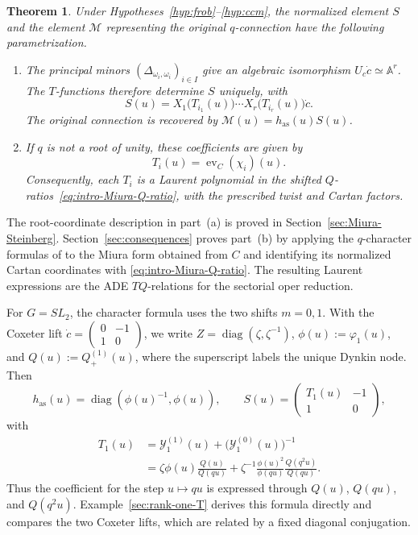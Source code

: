 \documentclass[11pt,leqno]{amsart}
\numberwithin{equation}{section}
\theoremstyle{plain}
\newtheorem{theorem}{Theorem}[section]
\theoremstyle{definition}
\theoremstyle{plain}
\theoremstyle{definition}
\theoremstyle{remark}
\begin{document}
\begin{theorem}\label{thm:intro-TQ-relations}
Under Hypotheses~\ref{hyp:frob}--\ref{hyp:ccm}, the normalized element $S$ and the element $\mathscr M$ representing the original $q$-connection have the following parametrization.
\begin{enumerate}[label=(\alph*)]
\item The principal minors $(\Delta_{\omega_i,\omega_i})_{i\in I}$ give an algebraic isomorphism $U_c\dot c\simeq\mathbb A^r$.  The $T$-functions therefore determine $S$ uniquely, with
\begin{equation}\label{eq:intro-Steinberg-T-parameterization}
 S(u)=X_1\bigl(T_{i_1}(u)\bigr)\cdots
       X_r\bigl(T_{i_r}(u)\bigr)\dot c.
\end{equation}
The original connection is recovered by $\mathscr M(u)=h_{\mathrm{as}}(u)S(u)$.
\item If $q$ is not a root of unity, these coefficients are given by
\begin{equation}\label{eq:intro-TQ-parameterization}
 T_i(u)=\operatorname{ev}_C(\chi_i)(u).
\end{equation}
Consequently, each $T_i$ is a Laurent polynomial in the shifted $Q$-ratios~\eqref{eq:intro-Miura-Q-ratio}, with the prescribed twist and Cartan factors.
\end{enumerate}
\end{theorem}

The root-coordinate description in part~(a) is proved in Section~\ref{sec:Miura-Steinberg}.  Section~\ref{sec:consequences} proves part~(b) by applying the $q$-character formulas of \cite{FL2025} to the Miura form obtained from $C$ and identifying its normalized Cartan coordinates with \eqref{eq:intro-Miura-Q-ratio}.  The resulting Laurent expressions are the ADE $TQ$-relations for the sectorial oper reduction.

For $G=SL_2$, the character formula uses the two shifts $m=0,1$.  With the Coxeter lift $\dot c=\left(\begin{smallmatrix}0&-1\\1&0\end{smallmatrix}\right)$, we write $Z=\operatorname{diag}(\zeta,\zeta^{-1})$, $\phi(u):=\varphi_1(u)$, and $Q(u):=Q_+^{(1)}(u)$, where the superscript labels the unique Dynkin node.  Then
\[
 h_{\mathrm{as}}(u)=\operatorname{diag}(\phi(u)^{-1},\phi(u)),
 \qquad
 S(u)=\begin{pmatrix}T_1(u)&-1\\1&0\end{pmatrix},
\]
with
\[
 \begin{aligned}
 T_1(u)
 &=\mathcal Y_1^{(1)}(u)+\bigl(\mathcal Y_1^{(0)}(u)\bigr)^{-1}\\
 &=\zeta\phi(u)\frac{Q(u)}{Q(qu)}
   +\zeta^{-1}\frac{\phi(u)^2}{\phi(qu)}\frac{Q(q^2u)}{Q(qu)}.
 \end{aligned}
\]
Thus the coefficient for the step $u\mapsto qu$ is expressed through $Q(u)$, $Q(qu)$, and $Q(q^2u)$.  Example~\ref{sec:rank-one-T} derives this formula directly and compares the two Coxeter lifts, which are related by a fixed diagonal conjugation.
\end{document}
